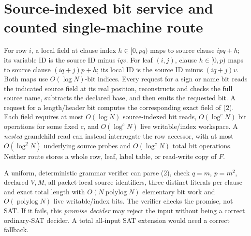 \documentclass[11pt]{article}
\begin{document}
\section{Source-indexed bit service and counted single-machine route}
For row \(i\), a local field at clause index
\(h\in[0,pq)\) maps to source clause
\(ipq+h\); its variable ID is the source ID minus \(iqv\).
For leaf \((i,j)\), clause \(h\in[0,p)\) maps
to source clause \((iq+j)p+h\); its local
ID is the source ID minus \((iq+j)v\). Both maps use
\(O(\log N)\)-bit indices. Every request for a sign or name bit
reads the indicated source field at its real position, reconstructs
and checks the full source name, subtracts the declared base,
and then emits the requested bit. A request for a length/header bit
computes the corresponding exact field of (2). Each field requires
at most \(O(\log N)\) source-indexed bit reads,
\(O(\log^cN)\) bit operations for some fixed \(c\),
and \(O(\log^c N)\) live writable/index workspace. A
\emph{nested} grandchild read can instead interrogate the row
accessor, with at most \(O(\log^2N)\) underlying source probes
and \(O(\log^cN)\) total bit operations. Neither route stores
a whole row, leaf, label table, or read-write copy of \(F\).

A uniform, deterministic grammar verifier can parse (2), check
\(q=m\), \(p=m^2\), declared \(V,M\), all packet-local source
identifiers, three distinct literals per clause and exact total
length with \(O(N\operatorname{polylog}N)\) elementary
bit work and \(O(\operatorname{polylog}N)\) live
writable/index bits. The verifier checks the promise, not SAT.
If it fails, this \emph{promise decider} may reject the input
without being a correct ordinary-SAT decider. A total
all-input SAT extension would need a correct fallback.
\end{document}
